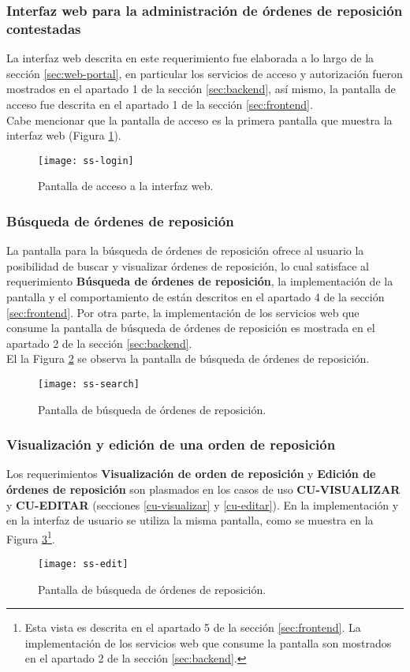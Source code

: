 \subsubsection{Interfaz web para la administración de órdenes de reposición contestadas}
La interfaz web descrita en este requerimiento fue elaborada a lo largo de la sección \ref{sec:web-portal}, en particular los servicios de acceso y autorización fueron mostrados en el apartado 1 de la sección \ref{sec:backend}, así mismo, la pantalla de acceso fue descrita en el apartado 1 de la sección \ref{sec:frontend}.\\
Cabe mencionar que la pantalla de acceso es la primera pantalla que muestra la interfaz web (Figura \ref{fig:ss-login}).
\begin{figure}[h]
	\centering
	\texttt{[image: ss-login]}
	\caption{Pantalla de acceso a la interfaz web.}
	\label{fig:ss-login}
\end{figure}

\subsubsection{Búsqueda de órdenes de reposición}
La pantalla para la búsqueda de órdenes de reposición ofrece al usuario la posibilidad de buscar y visualizar órdenes de reposición, lo cual satisface al requerimiento \textbf{Búsqueda de órdenes de reposición}, la implementación de la pantalla y el comportamiento de están descritos en el apartado 4 de la sección \ref{sec:frontend}. Por otra parte, la implementación de los servicios web que consume la pantalla de búsqueda de órdenes de reposición es mostrada en el apartado 2 de la sección \ref{sec:backend}.\\
El la Figura \ref{fig:ss-search} se observa la pantalla de búsqueda de órdenes de reposición.
\begin{figure}[h]
	\centering
	\texttt{[image: ss-search]}
	\caption{Pantalla de búsqueda de órdenes de reposición.}
	\label{fig:ss-search}
\end{figure}

\subsubsection{Visualización y edición de una orden de reposición}
Los requerimientos \textbf{Visualización de orden de reposición} y \textbf{Edición de órdenes de reposición} son plasmados en los casos de uso \textbf{CU-VISUALIZAR} y \textbf{CU-EDITAR} (secciones \ref{cu-visualizar} y \ref{cu-editar}). En la implementación y en la interfaz de usuario se utiliza la misma pantalla, como se muestra en la Figura \ref{fig:ss-edit}\footnote{Esta vista es descrita en el apartado 5 de la sección \ref{sec:frontend}. La implementación de los servicios web que consume la pantalla son mostrados en el apartado 2 de la sección \ref{sec:backend}.}.
\begin{figure}[h]
	\centering
	\texttt{[image: ss-edit]}
	\caption{Pantalla de búsqueda de órdenes de reposición.}
	\label{fig:ss-edit}
\end{figure}

